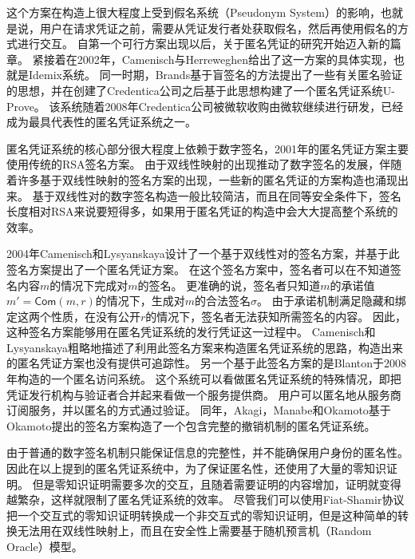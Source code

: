 这个方案在构造上很大程度上受到假名系统（Pseudonym System）\cite{chen1996access,lysyanskaya1999pseudonym}的影响，也就是说，用户在请求凭证之前，需要从凭证发行者处获取假名，然后再使用假名的方式进行交互。
自第一个可行方案出现以后，关于匿名凭证的研究开始迈入新的篇章。
紧接着在2002年，Camenisch与Herreweghen给出了这一方案的具体实现，也就是Idemix系统\cite{camenisch2002design}。
同一时期，Brands基于盲签名的方法提出了一些有关匿名验证的思想\cite{brands1999rethinking}，并在创建了Credentica公司之后基于此思想构建了一个匿名凭证系统U-Prove。
该系统随着2008年Credentica公司被微软收购由微软继续进行研发\cite{paquin2011u}，已经成为最具代表性的匿名凭证系统之一。

匿名凭证系统的核心部分很大程度上依赖于数字签名，2001年的匿名凭证方案主要使用传统的RSA签名方案。
由于双线性映射的出现推动了数字签名的发展，伴随着许多基于双线性映射的签名方案的出现\cite{boneh2001short,camenisch2004signature,okamoto2006efficient}，一些新的匿名凭证的方案构造也涌现出来。
基于双线性对的数字签名构造一般比较简洁，而且在同等安全条件下，签名长度相对RSA来说要短得多，如果用于匿名凭证的构造中会大大提高整个系统的效率。

2004年Camenisch和Lysyanskaya设计了一个基于双线性对的签名方案，并基于此签名方案提出了一个匿名凭证方案\cite{camenisch2004signature}。
在这个签名方案中，签名者可以在不知道签名内容$m$的情况下完成对$m$的签名。
更准确的说，签名者只知道$m$的承诺值$m'=\mathsf{Com}(m,r)$的情况下，生成对$m$的合法签名$\sigma$。
由于承诺机制满足隐藏和绑定这两个性质，在没有公开$r$的情况下，签名者无法获知所需签名的内容。
因此，这种签名方案能够用在匿名凭证系统的发行凭证这一过程中。
Camenisch和Lysyanskaya粗略地描述了利用此签名方案来构造匿名凭证系统的思路，构造出来的匿名凭证方案也没有提供可追踪性。
另一个基于此签名方案的是Blanton于2008年构造的一个匿名访问系统\cite{blanton2008online}。
这个系统可以看做匿名凭证系统的特殊情况，即把凭证发行机构与验证者合并起来看做一个服务提供商。
用户可以匿名地从服务商订阅服务，并以匿名的方式通过验证。
同年，Akagi，Manabe和Okamoto基于Okamoto提出的签名方案\cite{okamoto2006efficient}构造了一个包含完整的撤销机制的匿名凭证系统\cite{akagi2008efficient}。

由于普通的数字签名机制只能保证信息的完整性，并不能确保用户身份的匿名性。
因此在以上提到的匿名凭证系统中，为了保证匿名性，还使用了大量的零知识证明。
但是零知识证明需要多次的交互，且随着需要证明的内容增加，证明就变得越繁杂，这样就限制了匿名凭证系统的效率。
尽管我们可以使用Fiat-Shamir协议\cite{fiat1986prove}把一个交互式的零知识证明转换成一个非交互式的零知识证明，但是这种简单的转换无法用在双线性映射上\cite{张严2012匿名凭证方案研究进展}，而且在安全性上需要基于随机预言机（Random Oracle）模型。

